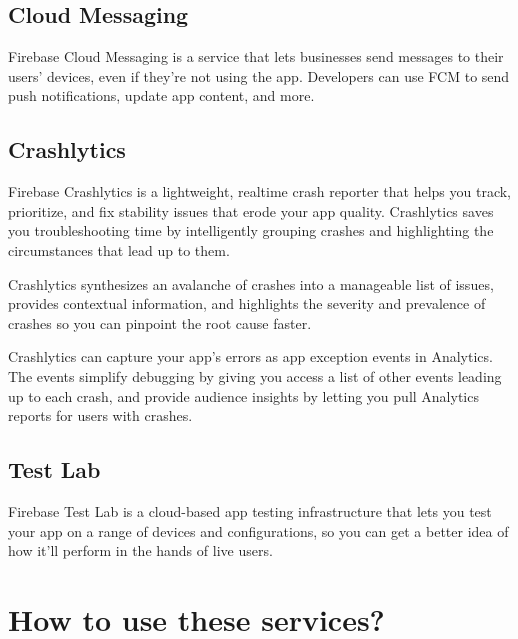 \documentclass[12pt,a4paper]{report}
\begin{document}
{\section{{\fontsize{16}{0}\selectfont Cloud Messaging
}}
{\fontsize{14}{0}\selectfont
\noindent
Firebase Cloud Messaging is a service that lets businesses send messages to their users' devices, even if they're not using the app. Developers can use FCM to send push notifications, update app content, and more.

}
\section{{\fontsize{16}{0}\selectfont Crashlytics
}}
{\fontsize{14}{0}\selectfont
\noindent
Firebase Crashlytics is a lightweight, realtime crash reporter that helps you track, prioritize, and fix stability issues that erode your app quality. Crashlytics saves you troubleshooting time by intelligently grouping crashes and highlighting the circumstances that lead up to them.

\hspace{1cm}Crashlytics synthesizes an avalanche of crashes into a manageable list of issues, provides contextual information, and highlights the severity and prevalence of crashes so you can pinpoint the root cause faster.

\hspace{1cm}Crashlytics can capture your app's errors as app exception events in Analytics. The events simplify debugging by giving you access a list of other events leading up to each crash, and provide audience insights by letting you pull Analytics reports for users with crashes.

}

\section{{\fontsize{16}{0}\selectfont Test Lab
}}
{\fontsize{14}{0}\selectfont
\noindent
Firebase Test Lab is a cloud-based app testing infrastructure that lets you test your app on a range of devices and configurations, so you can get a better idea of how it'll perform in the hands of live users.
}
}    
\newpage
\chapter{\fontsize{18}{0}\selectfont How to use these services? }
\end{document}
